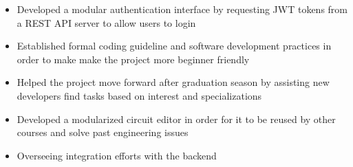 
\begin{itemize}
  \item Developed a modular authentication interface by requesting
  JWT tokens from a REST API server to allow users to login
  \item Established formal coding guideline and software development
  practices in order to make make the project more beginner friendly
  \item Helped the project move forward after graduation season by
  assisting new developers find tasks based on interest and specializations
  \item Developed a modularized circuit editor in order for it to be
  reused by other courses and solve past engineering issues
  \item Overseeing integration efforts with the backend
\end{itemize}